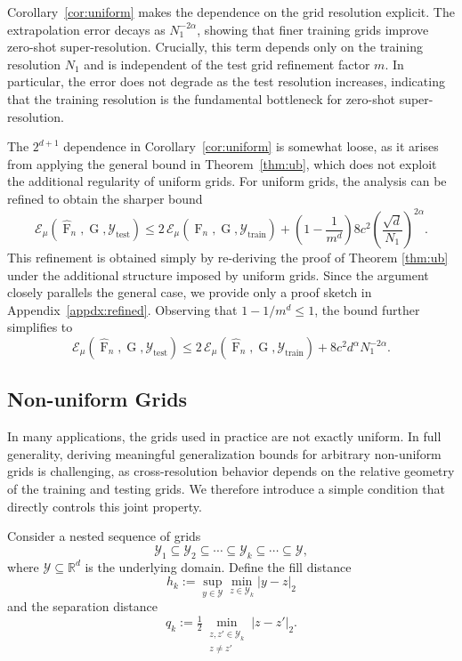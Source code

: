 \documentclass[11pt]{article}
\theoremstyle{plain}
\newcommand{\Ycal}{\mathcal{Y}}
\begin{document}
\noindent Corollary~\ref{cor:uniform} makes the dependence on the grid resolution explicit. 
The extrapolation error decays as $N_1^{-2\alpha}$, showing that finer training grids improve zero-shot super-resolution. 
Crucially, this term depends only on the training resolution $N_1$ and is independent of the test grid refinement factor $m$.
In particular, the error does not degrade as the test resolution increases, indicating that the training resolution is the fundamental bottleneck for zero-shot super-resolution.


The $2^{d+1}$ dependence in Corollary~\ref{cor:uniform} is somewhat loose, as it arises from applying
the general bound in Theorem~\ref{thm:ub}, which does not exploit the additional regularity of uniform grids. For
uniform grids, the analysis can be refined to obtain the sharper bound
\[
\mathcal{E}_\mu(\widehat{\operatorname{F}}_n, \operatorname{G}, \Ycal_{\mathrm{test}})
\le
2\, \mathcal{E}_\mu(\widehat{\operatorname{F}}_n, \operatorname{G}, \Ycal_{\mathrm{train}})
+
\left( 1 - \frac{1}{m^d} \right)
8c^2 \left( \frac{\sqrt{d}}{N_1} \right)^{2\alpha}.
\]
This refinement is obtained simply by re-deriving the proof of Theorem \ref{thm:ub} under the additional
structure imposed by uniform grids. Since the argument closely parallels the general case, we
provide only a proof sketch in Appendix~\ref{appdx:refined}. Observing that $1 - 1/m^d \le 1$, the
bound further simplifies to
\[
\mathcal{E}_\mu(\widehat{\operatorname{F}}_n, \operatorname{G}, \Ycal_{\mathrm{test}})
\le
2\, \mathcal{E}_\mu(\widehat{\operatorname{F}}_n, \operatorname{G}, \Ycal_{\mathrm{train}})
+
8c^2 d^{\alpha} N_1^{-2\alpha}.
\]

\subsection{Non-uniform Grids}

In many applications, the grids used in practice are not exactly uniform. In full generality, deriving meaningful generalization bounds for arbitrary non-uniform grids is challenging, as cross-resolution behavior depends on the relative geometry of the training and testing grids. We therefore introduce a simple condition that directly controls this joint property. 

Consider a nested sequence of grids
\[
\Ycal_1 \subseteq \Ycal_2 \subseteq \cdots \subseteq \Ycal_k \subseteq \cdots \subseteq \Ycal,
\]
where $\Ycal \subseteq \mathbb{R}^d$ is the underlying domain. Define the fill distance
\[
h_k := \sup_{y \in \Ycal} \min_{z \in \Ycal_k} |y - z|_2
\]
and the separation distance
\[
q_k := \tfrac{1}{2} \min_{\substack{z, z' \in \Ycal_k \\ z \neq z'}} |z - z'|_2.
\]
\end{document}
